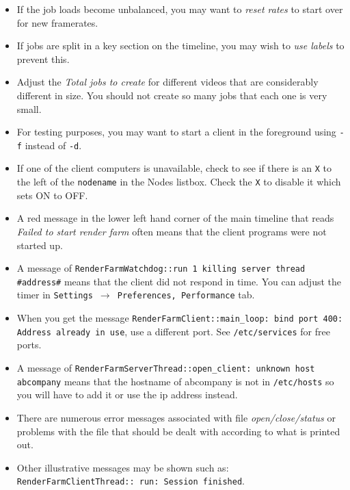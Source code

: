\begin{itemize}
  \texttt{/etc/hosts} and as the \texttt{lo} network device in
  ifconfig.
\item If the job loads become unbalanced, you may want to
  \textit{reset rates} to start over for new framerates.
\item If jobs are split in a key section on the timeline, you may
  wish to \textit{use labels} to prevent this.
\item Adjust the \textit{Total jobs to create} for different videos that
  are considerably different in size.  You should not create so 
  many jobs that each one is very small.
\item For testing purposes, you may want to start a client in the
  foreground using \texttt{-f} instead of \texttt{-d}.
\item If one of the client computers is unavailable, check to see if
  there is an \texttt{X} to the left of the \texttt{nodename} in the
  Nodes listbox.  Check the \texttt{X} to disable it which sets ON to
  OFF.
\item A red message in the lower left hand corner of the main
  timeline that reads \textit{Failed to start render farm} often means
  that the client \CGG{} programs were not started up.
\item A message of \texttt{RenderFarmWatchdog::run 1 killing server
    thread \\ \#address\#} means that the client did not respond in
  time.  You can adjust the timer in \texttt{Settings $\rightarrow$
    Preferences, Performance} tab.
\item When you get the message \texttt{RenderFarmClient::main\_loop:
    bind port 400: Address already in use}, use a different port. See \texttt{/etc/services} for free ports.
\item A message of \texttt{RenderFarmServerThread::open\_client:
    unknown host abcompany} means that the hostname of abcompany is not
  in \texttt{/etc/hosts} so you will have to add it or use the ip
  address instead.
\item There are numerous error messages associated with file
  \textit{open/close/status} or problems with the file that should be
  dealt with according to what is printed out.
\item Other illustrative messages may be shown such as:
  \texttt{RenderFarmClientThread:: run: Session finished}.
\end{itemize}

